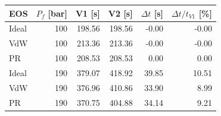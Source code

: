\begin{tabular}{lrrrrr}
\toprule
EOS & $P_f$ [bar] & V1 [s] & V2 [s] & $\Delta t$ [s] & $\Delta t/t_{V1}$ [\%] \\
\midrule
Ideal & 100 & 198.56 & 198.56 & -0.00 & -0.00 \\
VdW & 100 & 213.36 & 213.36 & -0.00 & -0.00 \\
PR & 100 & 208.53 & 208.53 & 0.00 & 0.00 \\
Ideal & 190 & 379.07 & 418.92 & 39.85 & 10.51 \\
VdW & 190 & 376.96 & 410.86 & 33.90 & 8.99 \\
PR & 190 & 370.75 & 404.88 & 34.14 & 9.21 \\
\bottomrule
\end{tabular}
